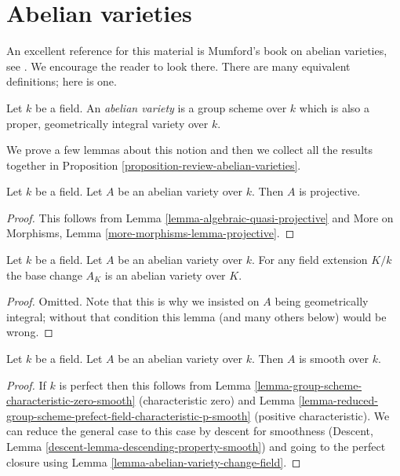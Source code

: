\section{Abelian varieties}
\label{section-abelian-varieties}

\noindent
An excellent reference for this material is Mumford's book on
abelian varieties, see \cite{AVar}. We encourage the reader to
look there. There are many equivalent definitions; here is one.

\begin{definition}
\label{definition-abelian-variety}
Let $k$ be a field. An {\it abelian variety} is a group scheme over
$k$ which is also a proper, geometrically integral variety over $k$.
\end{definition}

\noindent
We prove a few lemmas about this notion and then we collect
all the results together in
Proposition \ref{proposition-review-abelian-varieties}.

\begin{lemma}
\label{lemma-abelian-variety-projective}
Let $k$ be a field. Let $A$ be an abelian variety over $k$.
Then $A$ is projective.
\end{lemma}

\begin{proof}
This follows from
Lemma \ref{lemma-algebraic-quasi-projective} and
More on Morphisms, Lemma \ref{more-morphisms-lemma-projective}.
\end{proof}

\begin{lemma}
\label{lemma-abelian-variety-change-field}
Let $k$ be a field. Let $A$ be an abelian variety over $k$.
For any field extension $K/k$ the base change $A_K$ is an
abelian variety over $K$.
\end{lemma}

\begin{proof}
Omitted. Note that this is why we insisted on $A$ being
geometrically integral; without that condition this lemma
(and many others below) would be wrong.
\end{proof}

\begin{lemma}
\label{lemma-abelian-variety-smooth}
Let $k$ be a field. Let $A$ be an abelian variety over $k$.
Then $A$ is smooth over $k$.
\end{lemma}

\begin{proof}
If $k$ is perfect then this follows from
Lemma \ref{lemma-group-scheme-characteristic-zero-smooth}
(characteristic zero) and
Lemma \ref{lemma-reduced-group-scheme-prefect-field-characteristic-p-smooth}
(positive characteristic).
We can reduce the general case to this case by descent for smoothness
(Descent, Lemma \ref{descent-lemma-descending-property-smooth})
and going to the perfect closure using
Lemma \ref{lemma-abelian-variety-change-field}.
\end{proof}


